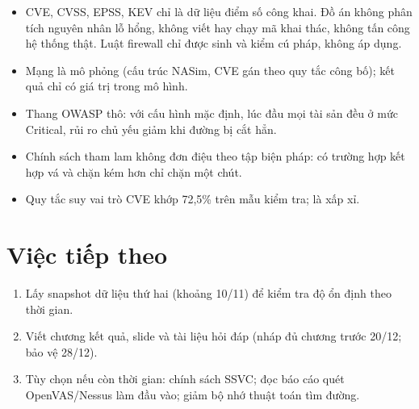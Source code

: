 \documentclass[11pt,a4paper]{article}
\begin{document}
\begin{itemize}
  \item CVE, CVSS, EPSS, KEV chỉ là dữ liệu điểm số công khai. Đồ án không phân tích nguyên nhân lỗ hổng, không viết hay chạy mã khai thác, không tấn công hệ thống thật. Luật firewall chỉ được sinh và kiểm cú pháp, không áp dụng.
  \item Mạng là mô phỏng (cấu trúc NASim, CVE gán theo quy tắc công bố); kết quả chỉ có giá trị trong mô hình.
  \item Thang OWASP thô: với cấu hình mặc định, lúc đầu mọi tài sản đều ở mức Critical, rủi ro chủ yếu giảm khi đường bị cắt hẳn.
  \item Chính sách tham lam không đơn điệu theo tập biện pháp: có trường hợp kết hợp vá và chặn kém hơn chỉ chặn một chút.
  \item Quy tắc suy vai trò CVE khớp 72,5\% trên mẫu kiểm tra; là xấp xỉ.
\end{itemize}

\section{Việc tiếp theo}

\begin{enumerate}
  \item Lấy snapshot dữ liệu thứ hai (khoảng 10/11) để kiểm tra độ ổn định theo thời gian.
  \item Viết chương kết quả, slide và tài liệu hỏi đáp (nháp đủ chương trước 20/12; bảo vệ 28/12).
  \item Tùy chọn nếu còn thời gian: chính sách SSVC; đọc báo cáo quét OpenVAS/Nessus làm đầu vào; giảm bộ nhớ thuật toán tìm đường.
\end{enumerate}
\end{document}
